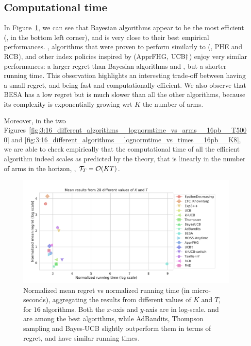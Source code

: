 \subsection{Computational time}

In Figure~\ref{fig:3:16_different_algorithms__lognormregret_vs_logtime__28pb}, we can see that Bayesian algorithms appear to be the most efficient (\ie, in the bottom left corner), and \klUCB{} is very close to their best empirical performances.
\UCB, algorithms that were proven to perform similarly to \UCB{} (\ie, PHE and RCB), and other index policies inspired by \UCB{} (ApprFHG, $\mathrm{UCB}\dagger$) enjoy very similar performances: a larger regret than Bayesian algorithms and \klUCB, but a shorter running time.
%
This observation highlights an interesting trade-off between having a small regret, and being fast and computationally efficient.
%
We also observe that BESA has a low regret but is much slower than all the other algorithms, because its complexity is exponentially growing wrt $K$ the number of arms.

Moreover, in the two Figures~\ref{fig:3:16_different_algorithms__lognormtime_vs_arms__16pb__T5000} and
\ref{fig:3:16_different_algorithms__lognormtime_vs_times__16pb__K8},
we are able to check empirically that the computational time of all the efficient algorithm indeed scales as predicted by the theory, that is
linearly in the number of arms in the horizon, \ie, $\mathcal{T}_T = \mathop{}\mathopen{}\mathcal{O}\mathopen{}\left(KT\right)$.

\begin{figure}[h!]  %
	\includegraphics[width=1.10\linewidth]{16_different_algorithms__lognormregret_vs_logtime__28pb.pdf}
	\caption[Normalized mean regret vs normalized running time (in micro-seconds).]{
        Normalized mean regret vs normalized running time (in micro-seconds),
        aggregating the results from different values of $K$ and $T$, for $16$ algorithms.
        Both the $x$-axis and $y$-axis are in log-scale.
        \UCB{} and \klUCB{} are among the best algorithms, while AdBandits, Thompson sampling and Bayes-UCB slightly outperform them in terms of regret, and have similar running times.
	}
	\label{fig:3:16_different_algorithms__lognormregret_vs_logtime__28pb}
\end{figure}


